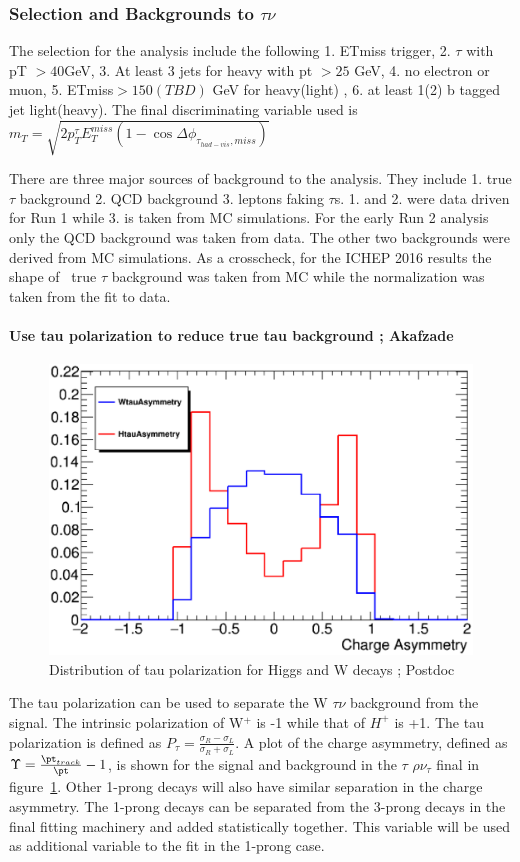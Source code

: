 \subsubsection{Selection and Backgrounds to \Hp $\tau\nu$}
The selection for the \Hp analysis include the following 1.  ETmiss trigger, 2. $\tau$ with pT $> 40 $GeV, 3. At least 3 jets for heavy \Hp with pt $> 25$ GeV, 4. no electron or muon,
5. ETmiss$ > 150(TBD)$ GeV for heavy(light) \Hp, 6.  at least 1(2) b tagged jet light(heavy).  The final discriminating variable used is 
$m_T = \sqrt{ 2p^\tau_TE^{miss}_T(1-\cos {\Delta \phi_{\tau_{had-vis},miss}})}  $

There are three major sources of background to the \Hp analysis.  They include 1. true $\tau$ background 2. QCD background 3. leptons faking $\tau$s.  1. and 2. were data driven for Run 1 while 3. is taken from MC simulations.  
For the early Run 2 analysis only the QCD background was taken from data.  The other two backgrounds were derived from MC simulations. As a crosscheck, for the ICHEP 2016 results the shape of \ttbar\, true $\tau$ background was taken
from MC while the normalization was taken from the fit to data.

\paragraph{Use tau polarization to reduce true tau background ; Akafzade}
\begin{figure}\label{fig:plot1}
\begin{center}
\includegraphics[height=0.32\textwidth]{tauAsy.eps}
\caption{Distribution of tau polarization for Higgs and W decays ;  Postdoc}
\label{fig:tau}
\end{center}
\end{figure}
The tau polarization can be used to separate the W \too $\tau \nu$ background from the signal.  The intrinsic polarization of W$^+$ is -1 while that of $H^+$ is +1.  The tau polarization is defined as $P_{\tau}=\frac{\sigma_R - \sigma_L}{\sigma_R + \sigma_L}$.
A plot of the charge asymmetry, defined as $\Upsilon=\frac{\pt_{track}}{\pt} - 1$, is shown for the signal and background in the $\tau$ \too $\rho \nu_{\tau}$ final in figure~\ref{fig:tau}. Other 1-prong decays will also have similar separation in the charge asymmetry. 
The 1-prong decays can be separated from the 3-prong decays in the final fitting machinery and added statistically together.  This variable will be used as additional variable to the fit in the 1-prong case.

